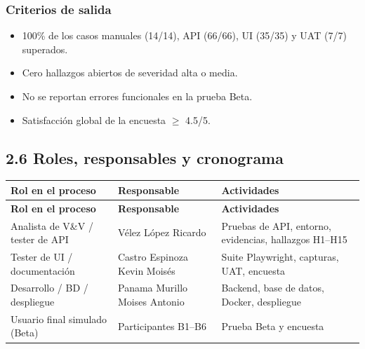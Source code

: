 \documentclass[11pt,a4paper]{article}
\begin{document}
\subsubsection*{Criterios de salida}


\begin{itemize}[leftmargin=*]
\item 100\% de los casos manuales (14/14), API (66/66), UI (35/35) y UAT (7/7) superados.
\item Cero hallazgos abiertos de severidad alta o media.
\item No se reportan errores funcionales en la prueba Beta.
\item Satisfacción global de la encuesta {$\geq$} 4.5/5.
\end{itemize}


\subsection*{2.6 Roles, responsables y cronograma}


{\small
\begin{longtable}{|p{}|p{}|p{}|}
\rowcolor{UTECblue}\color{white}\bfseries Rol en el proceso & \color{white}\bfseries Responsable & \color{white}\bfseries Actividades \\ \hline
\endfirsthead
\rowcolor{UTECblue}\color{white}\bfseries Rol en el proceso & \color{white}\bfseries Responsable & \color{white}\bfseries Actividades \\ \hline
\endhead
Analista de V\&V / tester de API & Vélez López Ricardo & Pruebas de API, entorno, evidencias, hallazgos H1--H15 \\ \hline
Tester de UI / documentación & Castro Espinoza Kevin Moisés & Suite Playwright, capturas, UAT, encuesta \\ \hline
Desarrollo / BD / despliegue & Panama Murillo Moises Antonio & Backend, base de datos, Docker, despliegue \\ \hline
Usuario final simulado (Beta) & Participantes B1--B6 & Prueba Beta y encuesta \\ \hline
\end{longtable}}
\end{document}
